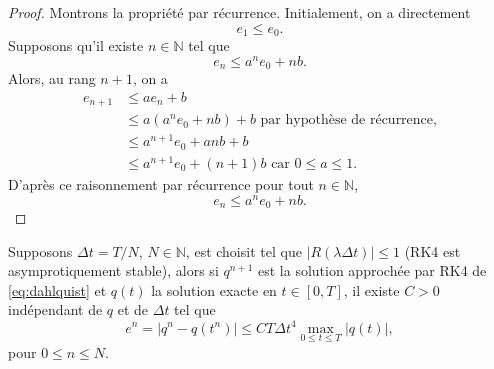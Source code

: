 \begin{proof}
Montrons la propriété par récurrence. Initialement, on a directement
\begin{equation}
e_1 \leq e_0.
\end{equation}
Supposons qu'il existe $n \in \mathbb{N}$ tel que
\begin{equation}
e_n \leq a^n e_0 + nb.
\end{equation}
Alors, au rang $n+1$, on a
\begin{align*}
e_{n+1} & \leq a e_n + b \\
	& \leq a \left( a^n e_0 + nb \right) + b \text{ par hypothèse de récurrence,}  \\
	& \leq a^{n+1} e_0 + anb + b\\
	& \leq a^{n+1} e_0 + (n+1)b \text{ car } 0 \leq a \leq 1.
\end{align*}
D'après ce raisonnement par récurrence pour tout $n \in \mathbb{N}$,
\begin{equation}
e_n \leq a^n e_0 + nb.
\end{equation}
\end{proof}

\begin{proposition}
Supposons $\Delta t = T/N$, $N \in \mathbb{N}$, est choisit tel que $|R(\lambda \Delta t ) | \leq 1$ (RK4 est asymprotiquement stable), alors si $q^{n+1}$ est la solution approchée par RK4 de \eqref{eq:dahlquist} et $q(t)$ la solution exacte en $t \in [0,T]$, il existe $C>0$ indépendant de $q$ et de $\Delta t$ tel que
\begin{equation}
e^{n} = | q^{n} - q(t^{n}) | \leq C T \Delta t^4 \max_{0 \leq t \leq T} | q(t) |,
\end{equation}
pour $0 \leq n \leq N$.
\label{prop:consistance_rk4}
\end{proposition}

